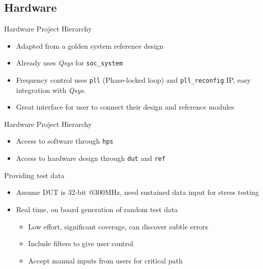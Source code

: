 \documentclass[t]{beamer}
\begin{document}
\subsection{Hardware}
\begin{frame}{Hardware Project Hierarchy}
  \begin{itemize}[<+->]
    \item Adapted from a golden system reference design
  \end{itemize}
  \begin{figure}[H]
    \centering
    \resizebox{0.8\textwidth}{!}{%
      
    }
  \end{figure}
  \begin{itemize}[<+->]
    \item Already uses \textit{Qsys} for \texttt{soc\_system}
    \item Frequency control uses \texttt{pll} (Phase-locked loop) and \texttt{pll\_reconfig} IP, easy integration with \textit{Qsys}.
    \item Great interface for user to connect their design and reference modules
  \end{itemize}

\end{frame}

\begin{frame}{Hardware Project Hierarchy}
  \begin{figure}[H]
    \centering
    \resizebox{0.8\textwidth}{!}{%
      
    }
  \end{figure}
  \begin{itemize}[<+->]
    \item Access to software through \texttt{hps}
    \item Access to hardware design through \texttt{dut} and \texttt{ref}
  \end{itemize}
\end{frame}


\begin{frame}{Providing test data}
  \begin{itemize}
    \item<+-> Assume DUT is 32-bit @300MHz, need sustained data input for stress testing \newline
    \item<+-> Real time, on board generation of random test data
    \begin{itemize}
      \item Low effort, significant coverage, can discover subtle errors
      \item Include filters to give user control
      \item Accept manual inputs from users for critical path
    \end{itemize}
  \end{itemize}
\end{frame}
\end{document}

